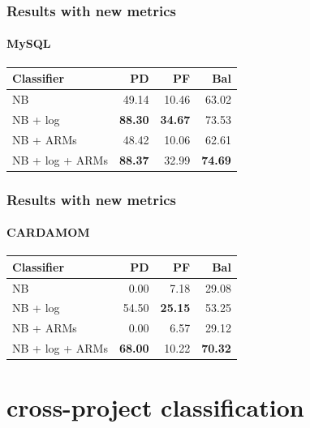 \documentclass{beamer}
\begin{document}
\begin{frame}
 \frametitle{Results with new metrics}
 \framesubtitle{MySQL}
 \begin{center}
 \begin{tabular}{lrrr}
  \hspace{0.2cm} Classifier & PD & PF & Bal\\
  \hline
  NB & 49.14 & 10.46 & 63.02\\
  NB + log &  \textbf{88.30} & \textbf{34.67} & 73.53\\
  NB + ARMs & 48.42 & 10.06 & 62.61\\
  NB + log + ARMs & \textbf{88.37} & 32.99 & \textbf{74.69}\\
  \hline
 \end{tabular}
 \end{center}
\end{frame}

\begin{frame}
 \frametitle{Results with new metrics}
 \framesubtitle{CARDAMOM}
 \begin{center}
 \begin{tabular}{lrrr}
  \hspace{0.2cm} Classifier & PD & PF & Bal\\
  \hline
  NB & 0.00 & 7.18 & 29.08\\
  NB + log & 54.50 & \textbf{25.15} & 53.25\\
  NB + ARMs & 0.00 & 6.57 & 29.12\\
  NB + log + ARMs & \textbf{68.00} & 10.22 & \textbf{70.32}\\
  \hline
 \end{tabular}
 \end{center}
\end{frame}

\section{cross-project classification}
\end{document}

